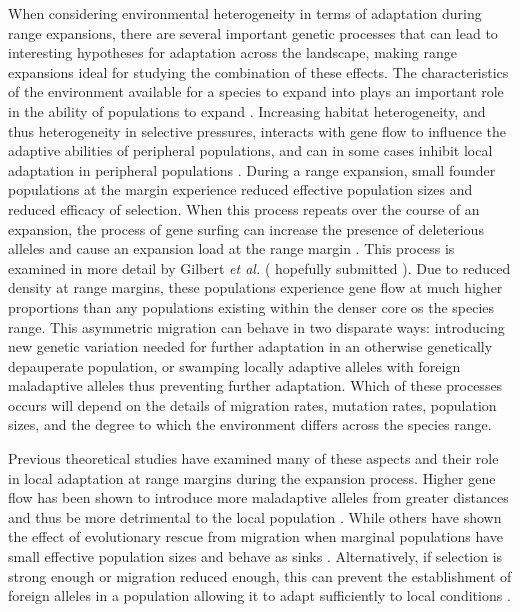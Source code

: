 When considering environmental heterogeneity in terms of adaptation during range expansions, there are several important genetic processes that can lead to interesting hypotheses for adaptation across the landscape, making range expansions ideal for studying the combination of these effects. 
The characteristics of the environment available for a species to expand into plays an important role in the ability of populations to expand \citep{Aguilee:2012, Barton:2001, Pease:1989}. Increasing habitat heterogeneity, and thus heterogeneity in selective pressures, interacts with gene flow to influence the adaptive abilities of peripheral populations, and can in some cases inhibit local adaptation in peripheral populations \citep{Slatkin:1987,Kirkpatrick:1997, Ronce:2001}. During a range expansion, small founder populations at the margin experience reduced effective population sizes and reduced efficacy of selection. When this process repeats over the course of an expansion, the process of gene surfing \citep{Klopfstein:2006} can increase the presence of deleterious alleles and cause an expansion load at the range margin \citep{Peischl:2013}. This process is examined in more detail by Gilbert \emph{et al.} (\color{red} \footnotesize hopefully submitted \normalsize \color{black}). %
Due to reduced density at range margins, these populations experience gene flow at much higher proportions than any populations existing within the denser core os the species range. This asymmetric migration can behave in two disparate ways: introducing new genetic variation needed for further adaptation in an otherwise genetically depauperate population, or swamping locally adaptive alleles with foreign maladaptive alleles thus preventing further adaptation. Which of these processes occurs will depend on the details of migration rates, mutation rates, population sizes, and the degree to which the environment differs across the species range.

Previous theoretical studies have examined many of these aspects and their role in local adaptation at range margins during the expansion process. Higher gene flow has been shown to introduce more maladaptive alleles from greater distances and thus be more detrimental to the local population \citep{GarciaRamos:1997}. While others have shown the effect of evolutionary rescue from migration when marginal populations have small effective population sizes and behave as sinks \citep{Holt:1997,Gomulkiewicz:1999,Ching:2012}. Alternatively, if selection is strong enough or migration reduced enough, this can prevent the establishment of foreign alleles in a population allowing it to adapt sufficiently to local conditions \citep{Ronce:2001}. 

